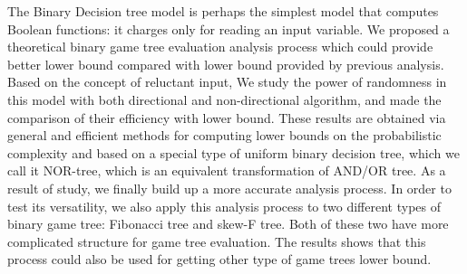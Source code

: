 \begin{sloppypar}
 The Binary Decision tree model is perhaps the simplest model that computes Boolean functions: it charges only for reading an input variable. We proposed a theoretical binary game tree evaluation analysis process which could provide better lower bound compared with lower bound provided by previous analysis. Based on the concept of reluctant input, We study the power of randomness in this model with both directional and non-directional algorithm, and made the comparison of their efficiency with lower bound. These results are obtained via general and efficient methods for computing  lower bounds on the probabilistic complexity and based on a special type of uniform binary decision tree, which we call it NOR-tree, which is an equivalent transformation of AND/OR tree. As a result of study, we finally build up a more accurate analysis process. In order to test its versatility, we also apply this analysis process to two different types of binary game tree: Fibonacci tree and skew-F tree. Both of these two have more complicated structure for game tree evaluation. The results shows that this process could also be used for getting other type of game trees lower bound.

\newpage
\end{sloppypar}
%
%
